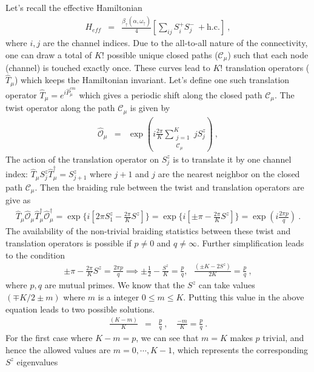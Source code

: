 \documentclass[10pt]{iopart}
\begin{document}
Let's recall the effective Hamiltonian
\begin{eqnarray}
H_{eff} &=& \frac{\beta_{\uparrow}(\alpha,\omega_{\uparrow})}{4} \left[ \displaystyle\sum_{ij} S_i^+S_j^- ~+ \textrm{h.c.} \right]~,
\end{eqnarray}
where $i,j$ are the channel indices. Due to the all-to-all nature of the connectivity, one can draw a total of $K!$ possible unique closed paths ($\mathcal{C}_{\mu}$) such that each node (channel) is touched exactly once. These curves lead to $K!$ translation operators ($\hat{T}_{\mu}$) which keeps the Hamiltonian invariant. Let's define one such translation operator $\hat{T}_{\mu}=e^{i\hat{P}^{cm}_{{\mu}}}$ which gives a periodic shift along the closed path $\mathcal{C}_{\mu}$. The twist operator along the path $\mathcal{C}_{\mu}$ is given by
\begin{eqnarray}
\hat{\mathcal{O}}_{\mu} &=& \exp({i\frac{2\pi}{K} \displaystyle\sum_{\substack{j=1\\ \mathcal{C}_{\mu}}}^{K} j S_j^z} )~,
\end{eqnarray}
The action of the translation operator on \(S_j^z\) is to translate it by one channel index: $\hat{T}_{\mu} S_j^z \hat T^\dagger_\mu = S_{j+1}^z$ where $j+1$ and $j$ are the nearest neighbor on the closed path $\mathcal{C}_{\mu}$. Then the braiding rule between the twist and translation operators are give as
\begin{eqnarray}
\hat{T}_{\mu}\hat{\mathcal{O}}_{\mu} \hat{T}^{\dagger}_{\mu} \hat{\mathcal{O}}_{\mu}^{\dagger} = \exp\{i[2\pi S_1^z-\frac{2\pi}{K}S^z]\} = \exp\{i[\pm \pi - \frac{2\pi}{K} S^z]\} =\exp(i\frac{2\pi p}{q})~.
\end{eqnarray}
The availability of the non-trivial braiding statistics between these twist and translation operators is possible if $p\neq 0$ and $q\neq \infty$. Further simplification leads to the condition
\begin{eqnarray}
 \pm\pi -\frac{2\pi}{K} S^z = \frac{2\pi p}{q} \implies  \pm\frac{1}{2}-\frac{S^z}{K} = \frac{p}{q} , ~ ~ ~ \frac{(\pm K-2S^z)}{2K} = \frac{p}{q}~,
\end{eqnarray} 
where $p,q$ are mutual primes. We know that the $S^z$ can take values $(\mp K/2\pm m)$ where $m$ is a integer $0 \leq m \leq K$. Putting this value in the above equation leads to two possible solutions.
\begin{eqnarray}
\frac{(K-m)}{K} &=& \frac{p}{q} ~,\quad \frac{-m}{K}=\frac{p}{q}~.
\end{eqnarray}
For the first case where $K-m=p$, we can see that $m=K$ makes $p$ trivial, and hence the allowed values are $m=0,\cdots,K-1$, which represents the corresponding $S^z$ eigenvalues 
\end{document}
